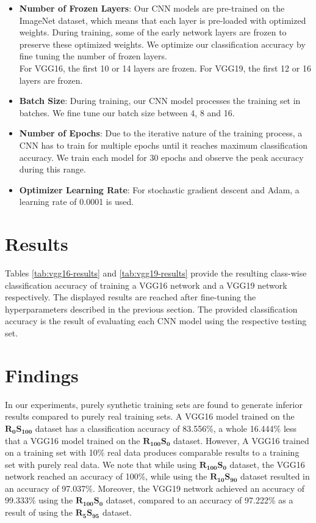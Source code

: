 \begin{itemize}
  \item \textbf{Number of Frozen Layers}: Our CNN models are pre-trained on the ImageNet dataset, which means that each layer is pre-loaded with optimized weights. During training, some of the early network layers are frozen to preserve these optimized weights. We optimize our classification accuracy by fine tuning the number of frozen layers.
  \\For VGG16, the first 10 or 14 layers are frozen. For VGG19, the first 12 or 16 layers are frozen.
  \item \textbf{Batch Size}: During training, our CNN model processes the training set in batches. We fine tune our batch size between 4, 8 and 16.
  \item \textbf{Number of Epochs}: Due to the iterative nature of the training process, a CNN has to train for multiple epochs until it reaches maximum classification accuracy. We train each model for 30 epochs and observe the peak accuracy during this range.
  \item \textbf{Optimizer Learning Rate}: For stochastic gradient descent and Adam, a learning rate of 0.0001 is used.
\end{itemize}


\section{Results}\label{sec:results}

Tables \ref{tab:vgg16-results} and \ref{tab:vgg19-results} provide the resulting class-wise classification accuracy of training a VGG16 network and a VGG19 network respectively. The displayed results are reached after fine-tuning the hyperparameters described in the previous section. The provided classification accuracy is the result of evaluating each CNN model using the respective testing set.


\section{Findings}\label{sec:findings}

In our experiments, purely synthetic training sets are found to generate inferior results compared to purely real training sets. A VGG16 model trained on the $\boldsymbol{R_{0}S_{100}}$ dataset has a classification accuracy of 83.556\%, a whole 16.444\% less that a VGG16 model trained on the $\boldsymbol{R_{100}S_{0}}$ dataset. However, A VGG16 trained on a training set with 10\% real data produces comparable results to a training set with purely real data. We note that while using $\boldsymbol{R_{100}S_{0}}$ dataset, the VGG16 network reached an accuracy of 100\%, while using the $\boldsymbol{R_{10}S_{90}}$ dataset resulted in an accuracy of 97.037\%. Moreover, the VGG19 network achieved an accuracy of 99.333\% using the $\boldsymbol{R_{100}S_{0}}$ dataset, compared to an accuracy of 97.222\% as a result of using the $\boldsymbol{R_{5}S_{95}}$ dataset.

